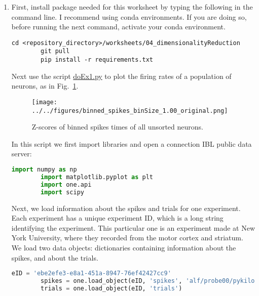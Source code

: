 \documentclass[12pt]{article}
\begin{document}
\begin{enumerate}

    \item First, install package needed for this worksheet by typing the
        following in the command line. I recommend using conda environments. If
        you are doing so, before running the next command, activate your conda
        environment.

        \begin{lstlisting}[backgroundcolor=\color{lightgray}]
        cd <repository_directory>/worksheets/04_dimensionalityReduction
        git pull
        pip install -r requirements.txt
        \end{lstlisting}

        Next use the script
        \href{https://github.com/joacorapela/statNeuro2025/blob/master/worksheets/04_dimensionalityReduction/doEx1.py}{doEx1.py}
        to plot the firing rates of a population of neurons, as in
        Fig.~\ref{fig:ex1}.

        \begin{figure}
            \begin{center}
                \texttt{[image: ../../figures/binned\_spikes\_binSize\_1.00\_original.png]}
                \caption{Z-scores of binned spikes times of all unsorted
                neurons.}
            \end{center}
            \label{fig:ex1}
        \end{figure}

        In this script we first import libraries and open a connection IBL public data
        server:

        \begin{lstlisting}[backgroundcolor=\color{lightgray},language=Python]
        import numpy as np
        import matplotlib.pyplot as plt
        import one.api
        import scipy
        \end{lstlisting}

        Next, we load information about the spikes and trials for one
        experiment. Each experiment has a unique experiment ID, which is a long
        string identifying the experiment. This particular one is an experiment
        made at New York University, where they recorded from the motor cortex
        and striatum.  We load two data objects: dictionaries containing
        information about the spikes, and about the trials.

        \begin{lstlisting}[backgroundcolor=\color{lightgray},language=Python]
        eID = 'ebe2efe3-e8a1-451a-8947-76ef42427cc9'
        spikes = one.load_object(eID, 'spikes', 'alf/probe00/pykilosort')
        trials = one.load_object(eID, 'trials')
        \end{lstlisting}


\end{enumerate}
\end{document}
